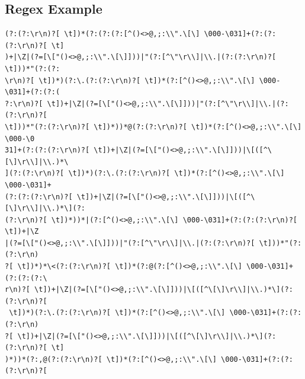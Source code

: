 \documentclass{beamer}
\begin{document}
\subsection{Regex Example}
\begin{frame}[fragile]
\begingroup
 \fontsize{6pt}{8pt}\selectfont
\begin{verbatim}
(?:(?:\r\n)?[ \t])*(?:(?:(?:[^()<>@,;:\\".\[\] \000-\031]+(?:(?:(?:\r\n)?[ \t]
)+|\Z|(?=[\["()<>@,;:\\".\[\]]))|"(?:[^\"\r\\]|\\.|(?:(?:\r\n)?[ \t]))*"(?:(?:
\r\n)?[ \t])*)(?:\.(?:(?:\r\n)?[ \t])*(?:[^()<>@,;:\\".\[\] \000-\031]+(?:(?:(
?:\r\n)?[ \t])+|\Z|(?=[\["()<>@,;:\\".\[\]]))|"(?:[^\"\r\\]|\\.|(?:(?:\r\n)?[
\t]))*"(?:(?:\r\n)?[ \t])*))*@(?:(?:\r\n)?[ \t])*(?:[^()<>@,;:\\".\[\] \000-\0
31]+(?:(?:(?:\r\n)?[ \t])+|\Z|(?=[\["()<>@,;:\\".\[\]]))|\[([^\[\]\r\\]|\\.)*\
](?:(?:\r\n)?[ \t])*)(?:\.(?:(?:\r\n)?[ \t])*(?:[^()<>@,;:\\".\[\] \000-\031]+
(?:(?:(?:\r\n)?[ \t])+|\Z|(?=[\["()<>@,;:\\".\[\]]))|\[([^\[\]\r\\]|\\.)*\](?:
(?:\r\n)?[ \t])*))*|(?:[^()<>@,;:\\".\[\] \000-\031]+(?:(?:(?:\r\n)?[ \t])+|\Z
|(?=[\["()<>@,;:\\".\[\]]))|"(?:[^\"\r\\]|\\.|(?:(?:\r\n)?[ \t]))*"(?:(?:\r\n)
?[ \t])*)*\<(?:(?:\r\n)?[ \t])*(?:@(?:[^()<>@,;:\\".\[\] \000-\031]+(?:(?:(?:\
r\n)?[ \t])+|\Z|(?=[\["()<>@,;:\\".\[\]]))|\[([^\[\]\r\\]|\\.)*\](?:(?:\r\n)?[
 \t])*)(?:\.(?:(?:\r\n)?[ \t])*(?:[^()<>@,;:\\".\[\] \000-\031]+(?:(?:(?:\r\n)
?[ \t])+|\Z|(?=[\["()<>@,;:\\".\[\]]))|\[([^\[\]\r\\]|\\.)*\](?:(?:\r\n)?[ \t]
)*))*(?:,@(?:(?:\r\n)?[ \t])*(?:[^()<>@,;:\\".\[\] \000-\031]+(?:(?:(?:\r\n)?[

\end{verbatim}
\end{frame}
\end{document}
